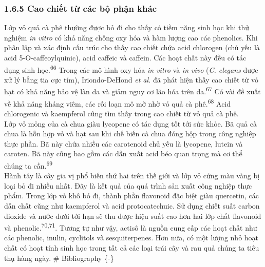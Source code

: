 \documentclass[
  letterpaper,
  DIV=11,
  numbers=noendperiod]{scrartcl}
\begin{document}
\subsubsection{1.6.5 Cao chiết từ các bộ phận
khác}\label{cao-chiux1ebft-tux1eeb-cuxe1c-bux1ed9-phux1eadn-khuxe1c}

Lớp vỏ quả cà phê thường được bỏ đi cho thấy có tiềm năng sinh học khi
thử nghiệm \emph{in vitro} có khả năng chống oxy hóa và hàm lượng cao
các phenolics. Khi phân lập và xác định cấu trúc cho thấy cao chiết chứa
acid chlorogen (chủ yếu là acid 5-O-caffeoylquinic), acid caffeic và
caffein. Các hoạt chất này đều có tác dụng sinh học.\textsuperscript{66}
Trong các mô hình oxy hóa \emph{in vitro} và \emph{in vivo} (\emph{C.
elegans} được xử lý bằng tia cực tím), Iriondo-DeHond \emph{et al.} đã
phát hiện thấy cao chiết từ vỏ hạt có khả năng bảo vệ làn da và giảm
nguy cơ lão hóa trên da.\textsuperscript{67} Có vài đề xuất về khả năng
kháng viêm, các rối loạn mô mỡ nhờ vỏ quả cà phê.\textsuperscript{68}
Acid chlorogenic và kaempferol cũng tìm thấy trong cao chiết từ vỏ quả
cà phê.\\
Lớp vỏ mỏng của cà chua giàu lycopene có tác dụng tốt tới sức khỏe. Bã
quả cà chua là hỗn hợp vỏ và hạt sau khi chế biến cà chua đóng hộp trong
công nghiệp thực phần. Bã này chứa nhiều các carotenoid chủ yếu là
lycopene, lutein và caroten. Bã này cũng bao gồm các dẫn xuất acid béo
quan trọng mà cơ thể chúng ta cần.\textsuperscript{69}\\
Hành tây là cây gia vị phổ biến thứ hai trên thế giới và lớp vỏ cứng màu
vàng bị loại bỏ đi nhiều nhất. Đây là kết quả của quá trình sản xuất
công nghiệp thực phẩm. Trong lớp vỏ khô bỏ đi, thành phần flavonoid đặc
biệt giàu quercetin, các dẫn chất cũng như kaempferol và acid
protocatechuic. Sử dụng chiết suất carbon dioxide và nước dưới tới hạn
sẽ thu được hiệu suất cao hơn hai lớp chất flavonoid và
phenolic.\textsuperscript{70,71}. Tương tự như vậy, actisô là nguồn cung
cấp các hoạt chất như các phenolic, inulin, cyclitols và sesquiterpenes.
Hơn nữa, có một lượng nhỏ hoạt chất có hoạt tính sinh học trong tất cả
các loại trái cây và rau quả chúng ta tiêu thụ hàng ngày. \#
Bibliography \{-\}
\end{document}
